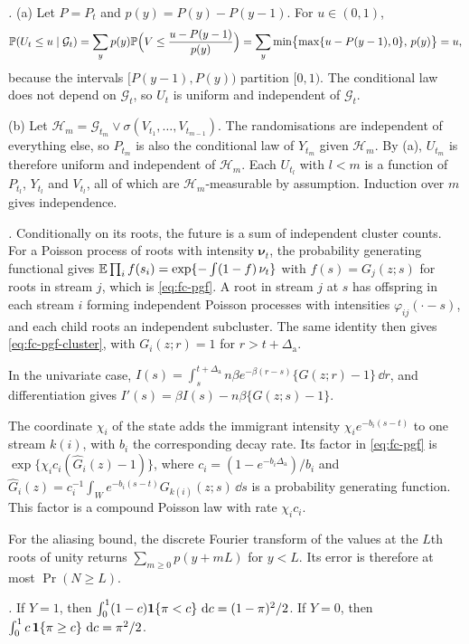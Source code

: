 \emph{.} (a) Let $P=P_t$ and $p(y)=P(y)-P(y-1)$. For $u\in(0,1)$,
\[
\Pr(U_t\le u\mid\mathcal G_t)=\sum_{y}p(y)\Pr\Bigl(V\le\frac{u-P(y-1)}{p(y)}\Bigr)
=\sum_y\min\bigl\{\max\{u-P(y-1),0\},\,p(y)\bigr\}=u ,
\]
because the intervals $[P(y-1),P(y))$ partition $[0,1)$. The conditional law does not
depend on $\mathcal G_t$, so $U_t$ is uniform and independent of $\mathcal G_t$.

(b) Let $\mathcal H_m=\mathcal G_{t_m}\vee\sigma(V_{t_1},\dots,V_{t_{m-1}})$. The
randomisations are independent of everything else, so $P_{t_m}$ is also the
conditional law of $Y_{t_m}$ given $\mathcal H_m$. By (a), $U_{t_m}$ is therefore uniform
and independent of $\mathcal H_m$. Each $U_{t_l}$ with $l<m$ is a function of
$P_{t_l}$, $Y_{t_l}$ and $V_{t_l}$, all of which are $\mathcal H_m$-measurable by
assumption. Induction over $m$ gives independence.

\emph{.} Conditionally on its roots, the future is a sum of
independent cluster counts. For a Poisson process of roots with intensity
$\bm\nu_t$, the probability generating functional gives
$\E\prod_if(s_i)=\exp\{-\int(1-f)\,\nu_t\}$ with $f(s)=G_{j}(z;s)$ for roots in stream
$j$, which is \eqref{eq:fc-pgf}. A root in stream $j$ at $s$ has offspring in each
stream $i$ forming independent Poisson processes with intensities
$\varphi_{ij}(\cdot-s)$, and each child roots an independent subcluster. The same
identity then gives \eqref{eq:fc-pgf-cluster}, with $G_i(z;r)=1$ for $r>t+\Delta_{\mathrm a}$.

In the univariate case,
$I(s)=\int_s^{t+\Delta_{\mathrm a}}n\beta e^{-\beta(r-s)}\{G(z;r)-1\}\,\dd r$, and differentiation
gives $I'(s)=\beta I(s)-n\beta\{G(z;s)-1\}$.

The coordinate $\chi_i$ of the state adds the immigrant intensity
$\chi_ie^{-b_i(s-t)}$ to one stream $k(i)$, with $b_i$ the corresponding decay rate. Its
factor in \eqref{eq:fc-pgf} is $\exp\{\chi_ic_i(\hat G_i(z)-1)\}$, where
$c_i=(1-e^{-b_i\Delta_{\mathrm a}})/b_i$ and
$\hat G_i(z)=c_i^{-1}\int_We^{-b_i(s-t)}G_{k(i)}(z;s)\,\dd s$ is a probability
generating function. This factor is a compound Poisson law with rate $\chi_ic_i$.

For the aliasing bound, the discrete Fourier transform of the values at the $L$th roots
of unity returns $\sum_{m\ge0}p(y+mL)$ for $y<L$. Its error is therefore at most
$\Pr(N\ge L)$.

\emph{.} If $Y=1$, then
$\int_0^1(1-c)\ind{\pi<c}\,\dd c=(1-\pi)^2/2$. If $Y=0$, then
$\int_0^1c\,\ind{\pi\ge c}\,\dd c=\pi^2/2$.
